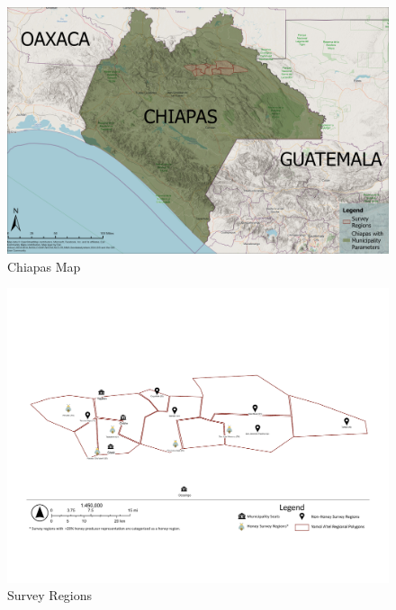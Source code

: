 \documentclass[../main.tex]{subfiles}
\begin{document}








\begin{figure}[h!]
    \centering
    \caption{Chiapas Map}
    \label{fig:map_chiapas_map}    
    \includegraphics[width=1\textwidth]{project/figures/map_chiapas.jpg}
\end{figure}

\begin{figure}[h!]
   \centering
   \caption{Survey Regions}
  \label{fig:map_survey_regions}    
  \includegraphics[width=1\textwidth]{project/figures/pdf/map_survey_locations.pdf}
\end{figure}
\end{document}
